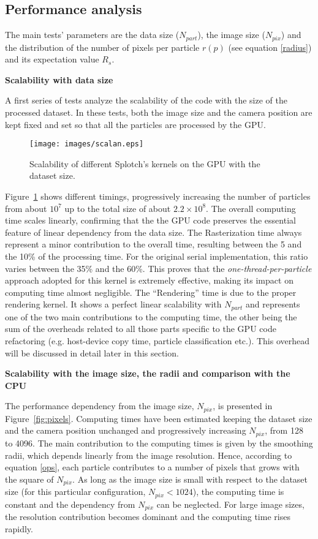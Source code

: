 \documentclass[1p]{elsarticle}
\begin{document}
\subsection{Performance analysis}
\label{sec:performance}
The main tests' parameters are the data size ($N_{part}$), the image size ($N_{pix}$)
and the distribution of the number of pixels 
per particle $r(p)$ (see equation \eqref{radius}) and its expectation value $R_s$.

\medskip
\noindent 
{\bf Scalability with data size}

\noindent
A first series of tests analyze the scalability of the code
with the size of the processed dataset. In these tests, both the image size
and the camera position are kept fixed and set so that all the particles are processed 
by the GPU.

\begin{figure}
\centering
\texttt{[image: images/scalan.eps]}
\caption{Scalability of different Splotch's kernels on the GPU with the dataset size.}
\label{fig:scalability}
\end{figure}

Figure~\ref{fig:scalability} shows different timings, progressively increasing the number of particles
from about $10^7$ up to the total size of about $2.2\times 10^8$. 
The overall computing time scales linearly, 
confirming that the the GPU code preserves the essential feature of linear dependency from the 
data size. 
The Rasterization time always represent 
a minor contribution to the overall time, resulting between the 5 and the 10\% of the processing 
time. For the original serial implementation, this ratio varies between the 35\% and the 60\%.
This proves that the {\it one-thread-per-particle} approach adopted for this kernel
is extremely effective, making its impact on computing time almost negligible.
The ``Rendering'' time 
is due to the proper rendering kernel. It shows a perfect linear scalability
with $N_{part}$ and represents one of the two main contributions
to the computing time, the other being the sum of the overheads related to all those 
parts specific to the GPU code refactoring 
(e.g. host-device copy time, particle classification etc.). 
This overhead  will be discussed in detail later in this section.

\medskip
\noindent
{\bf Scalability with the image size, the radii and comparison with the CPU}

\noindent
The performance dependency from the image size, $N_{pix}$, 
is presented in Figure~\ref{fig:pixels}. 
Computing times have been estimated 
keeping the dataset size and the camera position unchanged and progressively increasing
$N_{pix}$, from 128 to 4096. The main contribution to the computing times 
is given by the smoothing radii, which depends linearly from the image resolution.
Hence, according to equation \eqref{ops}, each particle contributes to a number of pixels 
that grows with the square of $N_{pix}$. As long as the image size is small with 
respect to the dataset size (for this particular configuration, $N_{pix} < 1024$), 
the computing time is constant and the dependency from $N_{pix}$ can be neglected. 
For large image sizes, the resolution contribution becomes dominant and the computing
time rises rapidly.  
\end{document}
